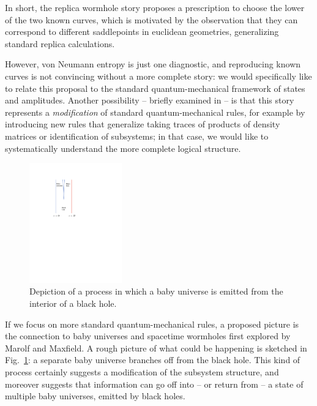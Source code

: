 \documentclass[12pt]{article}
\numberwithin{equation}{section}
\begin{document}
In short, the replica wormhole story proposes a prescription to choose the lower of the two known curves, which is motivated by the observation that they can correspond to different saddlepoints in euclidean geometries, generalizing standard replica calculations.

However, von Neumann entropy is just one diagnostic, and reproducing known curves is not convincing without a more complete story:  we would specifically like to relate this proposal to the standard quantum-mechanical framework of states and amplitudes.  Another possibility -- briefly examined in \cite{GiTu} -- is that this story represents a {\it modification} of standard quantum-mechanical rules, for example by introducing new rules that generalize taking traces of products of density matrices or identification of subsystems; in that case, we would like to systematically understand the more complete logical structure.

\begin{figure}[!hbtp] \begin{center}
\includegraphics[width=4cm]{Fig-bu.pdf}
\end{center}
\caption{Depiction of a process in which a baby universe is emitted from the interior of a black hole.}
\label{Figbu}
\end{figure} 

If we focus on  more standard quantum-mechanical rules, a proposed picture is the connection to baby universes and spacetime wormholes\cite{GiStinst,Cole,GiStinc,GiSt3Q} first explored by Marolf and Maxfield\cite{MaMa,MaMarev}.  A rough picture of what could be happening is sketched in Fig.~\ref{Figbu}: a separate baby universe branches off from the black hole.  This kind of process certainly suggests a modification of the subsystem structure, and moreover suggests that information can go off into -- or return from -- a state of multiple baby universes, emitted by black holes\cite{LRT,Hawkworm}.
\end{document}
